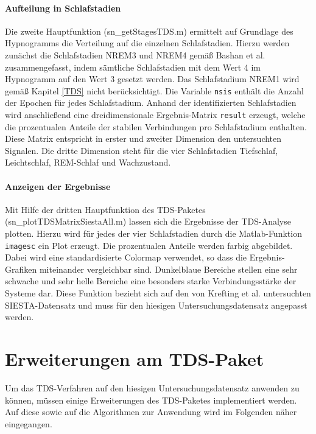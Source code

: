 \paragraph{Aufteilung in Schlafstadien} Die zweite Hauptfunktion (sn\_getStagesTDS.m) ermittelt auf Grundlage des Hypnogramms die Verteilung auf die einzelnen Schlafstadien. Hierzu werden zunächst die Schlafstadien \acs{NREM}3 und \acs{NREM}4 gemäß Bashan et al. zusammengefasst, indem sämtliche Schlafstadien mit dem Wert 4 im Hypnogramm auf den Wert 3 gesetzt werden. Das Schlafstadium \acs{NREM}1 wird gemäß Kapitel \ref{TDS} nicht berücksichtigt. Die Variable \texttt{nsis} enthält die Anzahl der Epochen für jedes Schlafstadium. Anhand der identifizierten Schlafstadien wird anschließend eine dreidimensionale Ergebnis-Matrix \texttt{result} erzeugt, welche die prozentualen Anteile der stabilen Verbindungen pro Schlafstadium enthalten. Diese Matrix entspricht in erster und zweiter Dimension den untersuchten Signalen. Die dritte Dimension steht für die vier Schlafstadien Tiefschlaf, Leichtschlaf, \acs{REM}-Schlaf und Wachzustand. 

\paragraph{Anzeigen der Ergebnisse} Mit Hilfe der dritten Hauptfunktion des \acs{TDS}-Paketes (sn\_plotTDSMatrixSiestaAll.m) lassen sich die Ergebnisse der \acs{TDS}-Analyse plotten. Hierzu wird für jedes der vier Schlafstadien durch die Matlab-Funktion \texttt{imagesc} ein Plot erzeugt. Die prozentualen Anteile werden farbig abgebildet. Dabei wird eine standardisierte Colormap verwendet, so dass die Ergebnis-Grafiken miteinander vergleichbar sind. Dunkelblaue Bereiche stellen eine sehr schwache und sehr helle Bereiche eine besonders starke Verbindungsstärke der Systeme dar. Diese Funktion bezieht sich auf den von Krefting et al. untersuchten SIESTA-Datensatz und muss für den hiesigen Untersuchungsdatensatz angepasst werden.

\section{Erweiterungen am TDS-Paket}\label{erweiterungTDS}

Um das \acs{TDS}-Verfahren auf den hiesigen Untersuchungsdatensatz anwenden zu können, müssen einige Erweiterungen des \acs{TDS}-Paketes implementiert werden. Auf diese sowie auf die Algorithmen zur Anwendung wird im Folgenden näher eingegangen.\\

